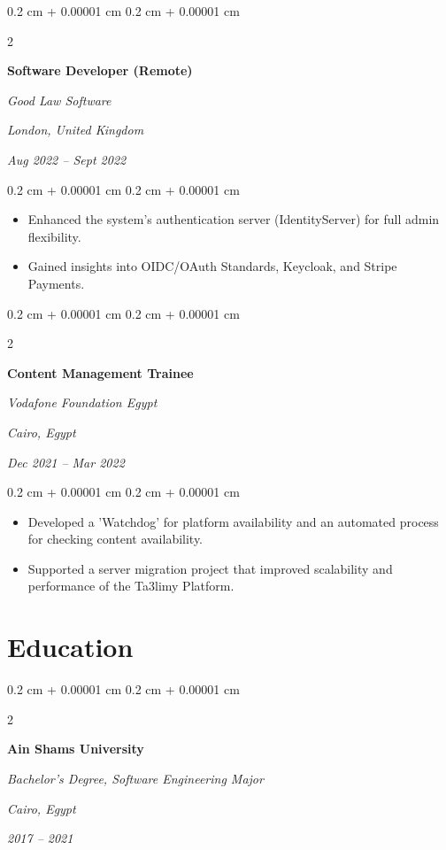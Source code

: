 \documentclass[10pt, letterpaper]{article}
\newenvironment{highlights}{ 
\begin{itemize}[ 
 topsep=0.10 cm, 
 parsep=0.10 cm, 
 partopsep=0pt, 
 itemsep=0pt, 
 leftmargin=0.4 cm + 10pt 
] 
 }{ 
\end{itemize} 
 } %
\newenvironment{onecolentry}{ 
\begin{adjustwidth}{ 
 0.2 cm + 0.00001 cm 
}{ 
 0.2 cm + 0.00001 cm 
} 
 }{ 
\end{adjustwidth} 
 } %
\newenvironment{twocolentry}[2][]{ 
\onecolentry 
\def\secondColumn{#2} 
\setcolumnwidth{\fill, 4.5 cm} 
\begin{paracol}{2} 
 }{ 
\switchcolumn \raggedleft \secondColumn 
\end{paracol} 
\endonecolentry 
 } %
\begin{document}
 \begin{twocolentry}{ 
 \textit{London, United Kingdom}
 
 \textit{Aug 2022 – Sept 2022}} 
\textbf{Software Developer (Remote)} 
 
\textit{Good Law Software} 
 \end{twocolentry} 

 \vspace{0.10 cm} 
 \begin{onecolentry} 
\begin{highlights} 
 \item Enhanced the system's authentication server (IdentityServer) for full admin flexibility. 
 \item Gained insights into OIDC/OAuth Standards, Keycloak, and Stripe Payments. 
\end{highlights} 
 \end{onecolentry} 

 \vspace{0.2 cm} 

 \begin{twocolentry}{ 
 \textit{Cairo, Egypt}
 
 \textit{Dec 2021 – Mar 2022}} 
\textbf{Content Management Trainee} 
 
\textit{Vodafone Foundation Egypt} 
 \end{twocolentry} 

 \vspace{0.10 cm} 
 \begin{onecolentry} 
\begin{highlights} 
 \item Developed a 'Watchdog' for platform availability and an automated process for checking content availability. 
 \item Supported a server migration project that improved scalability and performance of the Ta3limy Platform. 
\end{highlights} 
 \end{onecolentry} 


\section{Education} 

 \begin{twocolentry}{ 
 \textit{Cairo, Egypt} 

 \textit{2017 – 2021}} 
\textbf{Ain Shams University} 

\textit{Bachelor's Degree, Software Engineering Major} 
 \end{twocolentry} 
\end{document}
